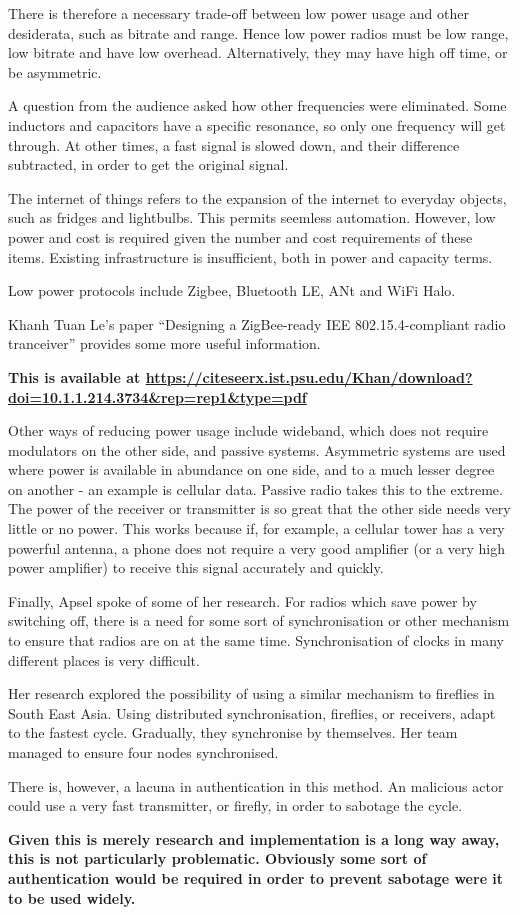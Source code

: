 \documentclass[11pt,a4paper]{report}
\begin{document}
\begin{multicols}{2}
		There is therefore a necessary trade-off between low power usage and other desiderata, such as bitrate and range. Hence low power radios must be low range, low bitrate and have low overhead. Alternatively, they may have high off time, or be asymmetric.
		
		A question from the audience asked how other frequencies were eliminated. Some inductors and capacitors have a specific resonance, so only one frequency will get through. At other times, a fast signal is slowed down, and their difference subtracted, in order to get the original signal. 
		
		The internet of things refers to the expansion of the internet to everyday objects, such as fridges and lightbulbs. This permits seemless automation. However, low power and cost is required given the number and cost requirements of these items. Existing infrastructure is insufficient, both in power and capacity terms.
		
		Low power protocols include Zigbee, Bluetooth LE, ANt and WiFi Halo.
		
		Khanh Tuan Le's paper ``Designing a ZigBee-ready IEE 802.15.4-compliant radio tranceiver'' provides some more useful information.
		
		\textbf{This is available at \url{https://citeseerx.ist.psu.edu/Khan/download?doi=10.1.1.214.3734&rep=rep1&type=pdf}}
		
		Other ways of reducing power usage include wideband, which does not require modulators on the other side, and passive systems. Asymmetric systems are used where power is available in abundance on one side, and to a much lesser degree on another - an example is cellular data. Passive radio takes this to the extreme. The power of the receiver or transmitter is so great that the other side needs very little or no power. This works because if, for example, a cellular tower has a very powerful antenna, a phone does not require a very good amplifier (or a very high power amplifier) to receive this signal accurately and quickly. 
		
		Finally, Apsel spoke of some of her research. For radios which save power by switching off, there is a need for some sort of synchronisation or other mechanism to ensure that radios are on at the same time. Synchronisation of clocks in many different places is very difficult.
		
		Her research explored the possibility of using a similar mechanism to fireflies in South East Asia. Using distributed synchronisation, fireflies, or receivers, adapt to the fastest cycle. Gradually, they synchronise by themselves. Her team managed to ensure four nodes synchronised.
		
		There is, however, a lacuna in authentication in this method. An malicious actor could use a very fast transmitter, or firefly, in order to sabotage the cycle.
		
		\textbf{Given this is merely research and implementation is a long way away, this is not particularly problematic. Obviously some sort of authentication would be required in order to prevent sabotage were it to be used widely.}
		
	\end{multicols}
	
\end{document}

